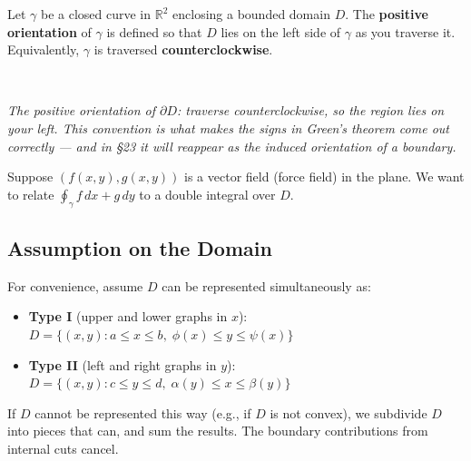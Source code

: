 \documentclass[11pt]{report}
\newcommand{\figcap}[1]{\\[1.5mm]\parbox{0.92\textwidth}{\small\itshape #1}}
\newcommand{\R}{\mathbb{R}}
\begin{document}
Let $\gamma$ be a closed curve in $\R^2$ enclosing a bounded domain $D$. The \textbf{positive orientation} of $\gamma$ is defined so that $D$ lies on the left side of $\gamma$ as you traverse it. Equivalently, $\gamma$ is traversed \textbf{counterclockwise}.

\begin{center}
%
\figcap{The positive orientation of $\partial D$: traverse counterclockwise, so the region lies on your left. This convention is what makes the signs in Green's theorem come out correctly --- and in \S23 it will reappear as the induced orientation of a boundary.}
\end{center}

Suppose $(f(x,y), g(x,y))$ is a vector field (force field) in the plane. We want to relate $\oint_\gamma f \, dx + g \, dy$ to a double integral over $D$.

\subsection*{Assumption on the Domain}

For convenience, assume $D$ can be represented simultaneously as:
\begin{itemize}
    \item \textbf{Type I} (upper and lower graphs in $x$): $D = \{(x,y) : a \leq x \leq b, \; \phi(x) \leq y \leq \psi(x)\}$
    \item \textbf{Type II} (left and right graphs in $y$): $D = \{(x,y) : c \leq y \leq d, \; \alpha(y) \leq x \leq \beta(y)\}$
\end{itemize}

If $D$ cannot be represented this way (e.g., if $D$ is not convex), we subdivide $D$ into pieces that can, and sum the results. The boundary contributions from internal cuts cancel.
\end{document}
